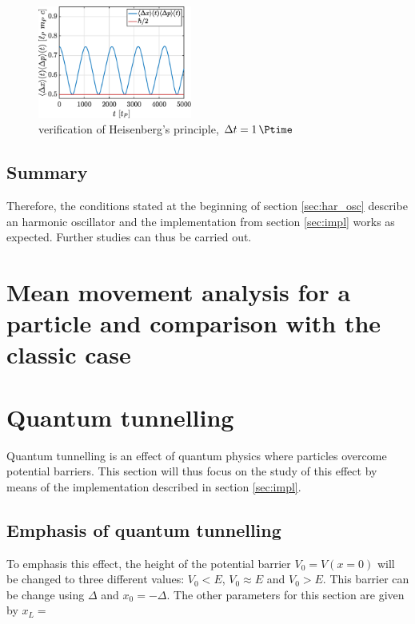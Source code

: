 \documentclass[a4paper,12pt,twoside]{article}
\begin{document}
    \begin{figure}[h]
      \centering
      \includegraphics[width=0.45\textwidth]{graphs/i_heisenberg.eps}
      \caption{verification of Heisenberg's principle, $\Delta t = \SI{1}{\Ptime}$}
      \label{fig:i_heisenberg}
    \end{figure}

    \subsection{Summary}
    Therefore, the conditions stated at the beginning of section \ref{sec:har_osc} describe an harmonic oscillator and the implementation from section \ref{sec:impl} works as expected.
    Further studies can thus be carried out.


\newpage
\section{Mean movement analysis for a particle and comparison with the classic case}


\newpage
\section{Quantum tunnelling}\label{sec:quantum_tunnelling}
  Quantum tunnelling is an effect of quantum physics where particles overcome potential barriers. \cite{wiki:quantum_tunnelling}
  This section will thus focus on the study of this effect by means of the implementation described in section \ref{sec:impl}.\\

  \subsection{Emphasis of quantum tunnelling}
  To emphasis this effect, the height of the potential barrier $V_0 = V(x=0)$ will be changed to three different values: $V_0<E$, $V_0 \approx E$ and $V_0>E$.
  This barrier can be change using $\Delta$ and $x_0 = -\Delta$.
  The other parameters for this section are given by $x_L=$
\end{document}
